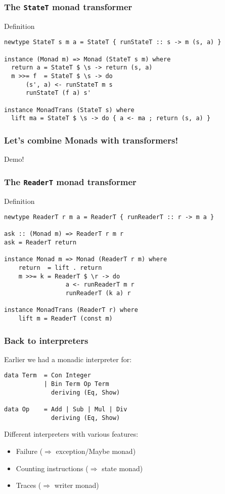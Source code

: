 \documentclass[pdftex,aspectratio=169]{beamer}
\begin{document}
\begin{frame}[fragile]
  \frametitle{The \texttt{StateT} monad transformer}
  \begin{block}{Definition}
\begin{lstlisting}
newtype StateT s m a = StateT { runStateT :: s -> m (s, a) }

instance (Monad m) => Monad (StateT s m) where
  return a = StateT $ \s -> return (s, a)
  m >>= f  = StateT $ \s -> do
      (s', a) <- runStateT m s
      runStateT (f a) s'

instance MonadTrans (StateT s) where
  lift ma = StateT $ \s -> do { a <- ma ; return (s, a) }
\end{lstlisting}
  \end{block}
\end{frame}


\begin{frame}[fragile]
  \frametitle{Let's combine Monads with transformers!}

  Demo!
\end{frame}


\begin{frame}[fragile]
  \frametitle{The \texttt{ReaderT} monad transformer}
  \begin{block}{Definition}
\begin{lstlisting}
newtype ReaderT r m a = ReaderT { runReaderT :: r -> m a }

ask :: (Monad m) => ReaderT r m r
ask = ReaderT return

instance Monad m => Monad (ReaderT r m) where
    return  = lift . return
    m >>= k = ReaderT $ \r -> do
                 a <- runReaderT m r
                 runReaderT (k a) r

instance MonadTrans (ReaderT r) where
    lift m = ReaderT (const m)
\end{lstlisting}
  \end{block}
\end{frame}

\begin{frame}[fragile]
  \frametitle{Back to interpreters}

  \begin{block}{Earlier we had a monadic interpreter for:}
    \begin{lstlisting}
data Term  = Con Integer
           | Bin Term Op Term
             deriving (Eq, Show)

data Op    = Add | Sub | Mul | Div
             deriving (Eq, Show)
    \end{lstlisting}
  \end{block}
  \pause
  Different interpreters with various features:
  \begin{itemize}
  \item Failure ($\Rightarrow$ exception/Maybe monad)
  \item Counting instructions ($\Rightarrow$ state monad)
  \item Traces ($\Rightarrow$ writer monad)
  \end{itemize}
\end{frame}
\end{document}
